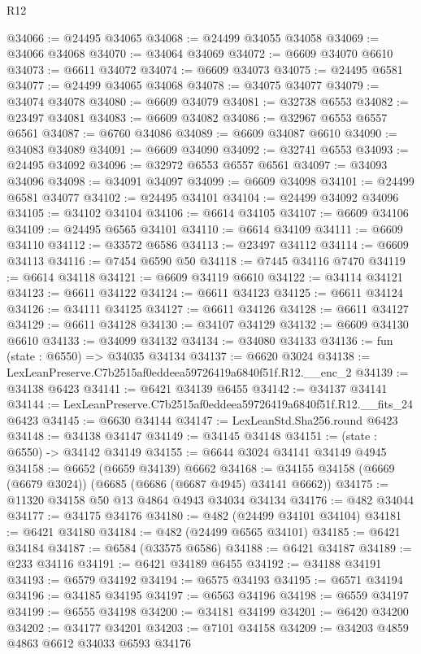 \begin{lexlean}{R12}
\begin{coremodule}
@34066 := @24495 @34065
@34068 := @24499 @34055 @34058
@34069 := @34066 @34068
@34070 := @34064 @34069
@34072 := @6609 @34070 @6610
@34073 := @6611 @34072
@34074 := @6609 @34073
@34075 := @24495 @6581
@34077 := @24499 @34065 @34068
@34078 := @34075 @34077
@34079 := @34074 @34078
@34080 := @6609 @34079
@34081 := @32738 @6553
@34082 := @23497 @34081
@34083 := @6609 @34082
@34086 := @32967 @6553 @6557 @6561
@34087 := @6760 @34086
@34089 := @6609 @34087 @6610
@34090 := @34083 @34089
@34091 := @6609 @34090
@34092 := @32741 @6553
@34093 := @24495 @34092
@34096 := @32972 @6553 @6557 @6561
@34097 := @34093 @34096
@34098 := @34091 @34097
@34099 := @6609 @34098
@34101 := @24499 @6581 @34077
@34102 := @24495 @34101
@34104 := @24499 @34092 @34096
@34105 := @34102 @34104
@34106 := @6614 @34105
@34107 := @6609 @34106
@34109 := @24495 @6565 @34101
@34110 := @6614 @34109
@34111 := @6609 @34110
@34112 := @33572 @6586
@34113 := @23497 @34112
@34114 := @6609 @34113
@34116 := @7454 @6590 @50
@34118 := @7445 @34116 @7470
@34119 := @6614 @34118
@34121 := @6609 @34119 @6610
@34122 := @34114 @34121
@34123 := @6611 @34122
@34124 := @6611 @34123
@34125 := @6611 @34124
@34126 := @34111 @34125
@34127 := @6611 @34126
@34128 := @6611 @34127
@34129 := @6611 @34128
@34130 := @34107 @34129
@34132 := @6609 @34130 @6610
@34133 := @34099 @34132
@34134 := @34080 @34133
@34136 := fun (state : @6550) => @34035 @34134
@34137 := @6620 @3024
@34138 := LexLeanPreserve.C7b2515af0eddeea59726419a6840f51f.R12.__enc_2
@34139 := @34138 @6423
@34141 := @6421 @34139 @6455
@34142 := @34137 @34141
@34144 := LexLeanPreserve.C7b2515af0eddeea59726419a6840f51f.R12.__fits_24 @6423
@34145 := @6630 @34144
@34147 := LexLeanStd.Sha256.round @6423
@34148 := @34138 @34147
@34149 := @34145 @34148
@34151 := (state : @6550) -> @34142 @34149
@34155 := @6644 @3024 @34141 @34149 @4945
@34158 := @6652 (@6659 @34139) @6662
@34168 := @34155 @34158 (@6669 (@6679 @3024)) (@6685 (@6686 (@6687 @4945) @34141 @6662))
@34175 := @11320 @34158 @50 @13 @4864 @4943 @34034 @34134
@34176 := @482 @34044
@34177 := @34175 @34176
@34180 := @482 (@24499 @34101 @34104)
@34181 := @6421 @34180
@34184 := @482 (@24499 @6565 @34101)
@34185 := @6421 @34184
@34187 := @6584 (@33575 @6586)
@34188 := @6421 @34187
@34189 := @233 @34116
@34191 := @6421 @34189 @6455
@34192 := @34188 @34191
@34193 := @6579 @34192
@34194 := @6575 @34193
@34195 := @6571 @34194
@34196 := @34185 @34195
@34197 := @6563 @34196
@34198 := @6559 @34197
@34199 := @6555 @34198
@34200 := @34181 @34199
@34201 := @6420 @34200
@34202 := @34177 @34201
@34203 := @7101 @34158
@34209 := @34203 @4859 @4863 @6612 @34033 @6593 @34176

\end{coremodule}
\end{lexlean}
